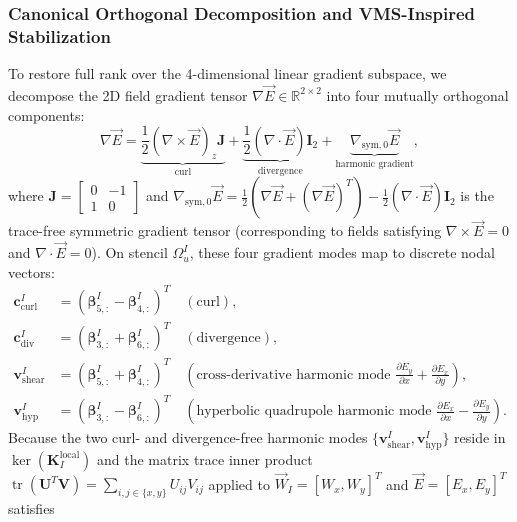 \documentclass[VANCOUVER,Times1COL]{WileyNJD-v5}
\begin{document}
\subsubsection{Canonical Orthogonal Decomposition and VMS-Inspired Stabilization}
\label{subsubsec:canonical_decomposition}

To restore full rank over the 4-dimensional linear gradient subspace, we decompose the 2D field gradient tensor $\nabla\vec{E} \in \mathbb{R}^{2 \times 2}$ into four mutually orthogonal components:
\begin{equation}
    \nabla \vec{E} = \underbrace{\frac{1}{2} (\nabla \times \vec{E})_z \mathbf{J}}_{\text{curl}} + \underbrace{\frac{1}{2} (\nabla \cdot \vec{E}) \mathbf{I}_2}_{\text{divergence}} + \underbrace{\nabla_{\mathrm{sym},0}\vec{E}}_{\text{harmonic gradient}},
    \label{eq:gradient_orthogonal_decomposition}
\end{equation}
where $\mathbf{J} = \begin{bmatrix} 0 & -1 \\ 1 & 0 \end{bmatrix}$ and $\nabla_{\mathrm{sym},0}\vec{E} = \frac{1}{2}(\nabla\vec{E} + (\nabla\vec{E})^T) - \frac{1}{2}(\nabla\cdot\vec{E})\mathbf{I}_2$ is the trace-free symmetric gradient tensor (corresponding to fields satisfying $\nabla\times\vec{E}=0$ and $\nabla\cdot\vec{E}=0$). On stencil $\Omega_u^I$, these four gradient modes map to discrete nodal vectors:
\begin{align}
    \mathbf{c}_{\mathrm{curl}}^I  & = (\boldsymbol{\beta}_{5, :}^I - \boldsymbol{\beta}_{4, :}^I)^T \quad (\text{curl}), \label{eq:v_curl_def}                   \\
    \mathbf{c}_{\mathrm{div}}^I   & = (\boldsymbol{\beta}_{3, :}^I + \boldsymbol{\beta}_{6, :}^I)^T \quad (\text{divergence}), \label{eq:v_div_def}                     \\
    \mathbf{v}_{\mathrm{shear}}^I & = (\boldsymbol{\beta}_{5, :}^I + \boldsymbol{\beta}_{4, :}^I)^T \quad \left(\text{cross-derivative harmonic mode } \frac{\partial E_y}{\partial x} + \frac{\partial E_x}{\partial y}\right), \label{eq:v_shear_def}                   \\
    \mathbf{v}_{\mathrm{hyp}}^I   & = (\boldsymbol{\beta}_{3, :}^I - \boldsymbol{\beta}_{6, :}^I)^T \quad \left(\text{hyperbolic quadrupole harmonic mode } \frac{\partial E_x}{\partial x} - \frac{\partial E_y}{\partial y}\right). \label{eq:v_hyp_def}
\end{align}
Because the two curl- and divergence-free harmonic modes $\{\mathbf{v}_{\mathrm{shear}}^I, \mathbf{v}_{\mathrm{hyp}}^I\}$ reside in $\ker(\mathbf{K}_I^{\mathrm{local}})$ and the matrix trace inner product $\operatorname{tr}(\mathbf{U}^T\mathbf{V}) = \sum_{i,j \in \{x,y\}} U_{ij} V_{ij}$ applied to $\vec{W}_I = [W_x, W_y]^T$ and $\vec{E} = [E_x, E_y]^T$ satisfies
\end{document}
